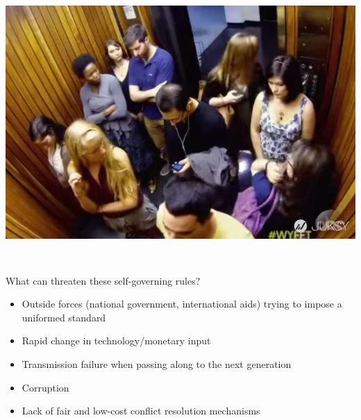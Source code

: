 \begin{frame}{}
\protect\hypertarget{section-44}{}

\includegraphics[width=\textwidth,height=4.16667in]{figures/m4_elevator.jpg}

\end{frame}

\begin{frame}{What can threaten these self-governing rules?}
\protect\hypertarget{what-can-threaten-these-self-governing-rules}{}

\end{frame}

\begin{frame}{}
\protect\hypertarget{section-45}{}

\begin{itemize}
\tightlist
\item
  Outside forces (national government, international aids) trying to
  impose a uniformed standard
\item
  Rapid change in technology/monetary input
\item
  Transmission failure when passing along to the next generation
\item
  Corruption
\item
  Lack of fair and low-cost conflict resolution mechanisms
\end{itemize}

\end{frame}

